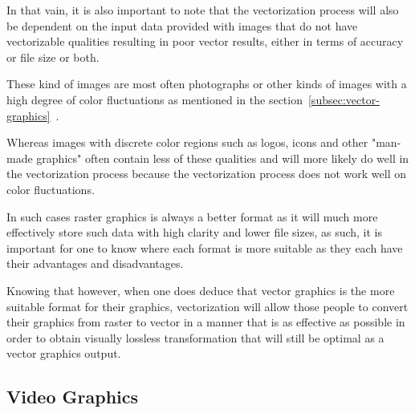 \documentclass[12pt]{article}
\newcommand{\sentence}{} %
\newcommand{\fullref}[1]{\ref{#1}~\nameref{#1}}
\begin{document}
    \bigskip
    \sentence
    In that vain, it is also important to note that the vectorization process will also be dependent on the input
    data provided with images that do not have vectorizable qualities resulting in poor vector results, either in
    terms of accuracy or file size or both.
    \sentence
    These kind of images are most often photographs or other kinds of images with a high degree of color fluctuations
    as mentioned in the section~\fullref{subsec:vector-graphics}.
    \sentence
    Whereas images with discrete color regions such as logos, icons and other "man-made graphics" often contain less
    of these qualities and will more likely do well in the vectorization process because the vectorization process
    does not work well on color fluctuations.
    \sentence
    In such cases raster graphics is always a better format as it will much more effectively store such data with
    high clarity and lower file sizes, as such, it is important for one to know where each format is more suitable as
    they each have their advantages and disadvantages.
    \sentence
    Knowing that however, when one does deduce that vector graphics is the more suitable format for their graphics,
    vectorization will allow those people to convert their graphics from raster to vector in a manner that is as
    effective as possible in order to obtain visually lossless transformation that will still be optimal as a vector
    graphics output.

    \subsection{Video Graphics}\label{subsec:video-graphics}
\end{document}
